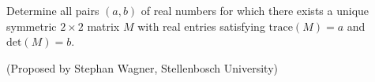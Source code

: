 Determine all pairs $(a, b)$ of real numbers for which there exists a unique symmetric $2\times 2$ matrix $M$ with real entries satisfying $\mathrm{trace}(M)=a$ and $\mathrm{det}(M)=b$.

(Proposed by Stephan Wagner, Stellenbosch University)